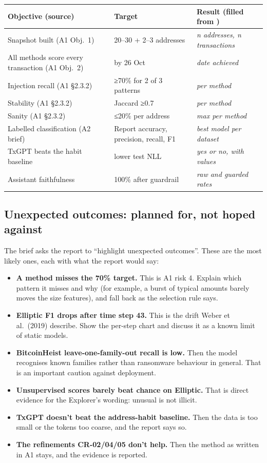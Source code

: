 \begin{center}
\small
\begin{tabularx}{\textwidth}{@{}L{5.0cm}L{3.2cm}Y@{}}
\toprule
\textbf{Objective (source)} & \textbf{Target} & \textbf{Result (filled from )} \\
\midrule
Snapshot built (A1 Obj.\ 1) & 20--30 + 2--3 addresses & \textit{n addresses, n transactions} \\
All methods score every transaction (A1 Obj.\ 2) & by 26 Oct & \textit{date achieved} \\
Injection recall (A1 §2.3.2) & ≥70\% for 2 of 3 patterns & \textit{per method} \\
Stability (A1 §2.3.2) & Jaccard ≥0.7 & \textit{per method} \\
Sanity (A1 §2.3.2) & ≤20\% per address & \textit{max per method} \\
Labelled classification (A2 brief) & Report accuracy, precision, recall, F1 & \textit{best model per dataset} \\
TxGPT beats the habit baseline & lower test NLL & \textit{yes or no, with values} \\
Assistant faithfulness & 100\% after guardrail & \textit{raw and guarded rates} \\
\bottomrule
\end{tabularx}
\end{center}

\subsection{Unexpected outcomes: planned for, not hoped against}

The brief asks the report to ``highlight unexpected outcomes''. These are the most likely ones,
each with what the report would say:
\begin{itemize}
  \item \textbf{A method misses the 70\% target.} This is A1 risk 4. Explain which pattern it
    misses and why (for example, a burst of typical amounts barely moves the size features), and
    fall back as the selection rule says.
  \item \textbf{Elliptic F1 drops after time step 43.} This is the drift Weber et al.\ (2019)
    describe. Show the per-step chart and discuss it as a known limit of static models.
  \item \textbf{BitcoinHeist leave-one-family-out recall is low.} Then the model recognises known
    families rather than ransomware behaviour in general. That is an important caution against
    deployment.
  \item \textbf{Unsupervised scores barely beat chance on Elliptic.} That is direct evidence for
    the Explorer's wording: unusual is not illicit.
  \item \textbf{TxGPT doesn't beat the address-habit baseline.} Then the data is too small or the
    tokens too coarse, and the report says so.
  \item \textbf{The refinements CR-02/04/05 don't help.} Then the method as written in A1 stays,
    and the evidence is reported.
\end{itemize}

